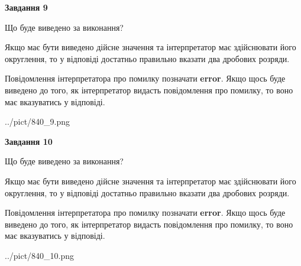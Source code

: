 \documentclass[12pt, ukrainian]{article}
\begin{document}
{\begin {Large}
{\begin {center}\textbf{Завдання 9}\end {center}}\par
Що буде виведено за виконання? \par

Якщо має бути виведено дійсне значення та інтерпретатор має здійснювати його округлення, 
то у відповіді достатньо правильно вказати два дробових розряди.

Повідомлення інтерпретатора про помилку позначати \textbf{error}.
Якщо щось буде виведено до того, як інтерпретатор видасть повідомлення про помилку, 
то воно має вказуватись у відповіді. \par

\begin{center}
	{../pict/840_9.png}
\end{center}
\newpage

{\begin {center}\textbf{Завдання 10}\end {center}}\par
Що буде виведено за виконання? \par

Якщо має бути виведено дійсне значення та інтерпретатор має здійснювати його округлення, 
то у відповіді достатньо правильно вказати два дробових розряди.

Повідомлення інтерпретатора про помилку позначати \textbf{error}.
Якщо щось буде виведено до того, як інтерпретатор видасть повідомлення про помилку, 
то воно має вказуватись у відповіді. \par

\begin{center}
	{../pict/840_10.png}
\end{center}
\newpage

\end {Large}}
\end{document}
